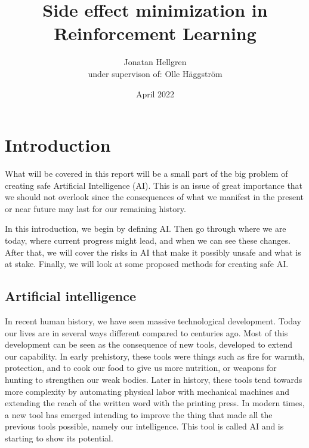 \documentclass[12pt,A4]{report}
\title{Side effect minimization in Reinforcement Learning}
\author{Jonatan Hellgren\\
under supervison of: Olle Häggström}
\date{April 2022}
\theoremstyle{definition}
\begin{document}
\maketitle


\thispagestyle{empty}

\newpage
{}

\tableofcontents

\newpage
{}

% 

\chapter{Introduction}
What will be covered in this report will be a small part of the big problem of creating safe Artificial Intelligence (AI). This is an issue of great importance that we should not overlook since the consequences of what we manifest in the present or near future may last for our remaining history. 

In this introduction, we begin by defining AI. Then go through where we are today, where current progress might lead, and when we can see these changes. After that, we will cover the risks in AI that make it possibly unsafe and what is at stake. Finally, we will look at some proposed methods for creating safe AI.


\section{Artificial intelligence}
In recent human history, we have seen massive technological development. Today our lives are in several ways different compared to centuries ago. Most of this development can be seen as the consequence of new tools, developed to extend our capability. In early prehistory, these tools were things such as fire for warmth, protection, and to cook our food to give us more nutrition, or weapons for hunting to strengthen our weak bodies. Later in history, these tools tend towards more complexity by automating physical labor with mechanical machines and extending the reach of the written word with the printing press. In modern times, a new tool has emerged intending to improve the thing that made all the previous tools possible, namely our intelligence. This tool is called AI and is starting to show its potential. 
\end{document}

